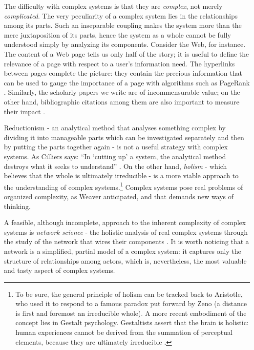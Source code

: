 \documentclass{article}
\begin{document}
The difficulty with complex systems is that they are \textit{complex}, not merely \textit{complicated}. The very peculiarity of a complex system lies in the relationships among its parts. Such an inseparable coupling makes the system more than the mere juxtaposition of its parts, hence the system as a whole cannot be fully understood simply by analyzing its components. Consider the Web, for instance. The content of a Web page tells us only half of the story; it is useful to define the relevance of a page with respect to a user's information need. The hyperlinks between pages complete the picture: they contain the precious information that can be used to gauge the importance of a page with algorithms such as PageRank \cite{F11-CACM}. Similarly, the scholarly papers we write are of incommensurable value; on the other hand, bibliographic citations among them are also important to measure their impact \cite{WBB10}.

Reductionism - an analytical method that analyses something complex by dividing it into manageable parts which can be investigated separately and then by putting the parts together again - is not a useful strategy with complex systems. As Cilliers says: ``In `cutting up' a system, the analytical method destroys what it seeks to understand'' \cite{C98}. On the other hand, \textit{holism} - which believes that the whole is ultimately irreducible - is a more viable approach to the understanding of complex systems.\footnote{To be sure, the general principle of holism can be tracked back to Aristotle, who used it to respond to a famous paradox put forward by Zeno (a distance is first and foremost an irreducible whole). A more recent embodiment of the concept lies in Gestalt psychology. Gestaltists assert that the brain is holistic: human experiences cannot be derived from the summation of perceptual elements, because they are ultimately irreducible \cite{G99}.} Complex systems pose real problems of organized complexity, as Weaver anticipated, and that demands new ways of thinking.


A feasible, although incomplete, approach to the inherent complexity of complex systems is \textit{network science} - the holistic analysis of real complex systems through the study of the network that wires their components  \cite{B02,N10}. It is worth noticing that a network is a simplified, partial model of a complex system: it captures only the structure of relationships among actors, which is, nevertheless, the most valuable and tasty aspect of complex systems. 
\end{document}
